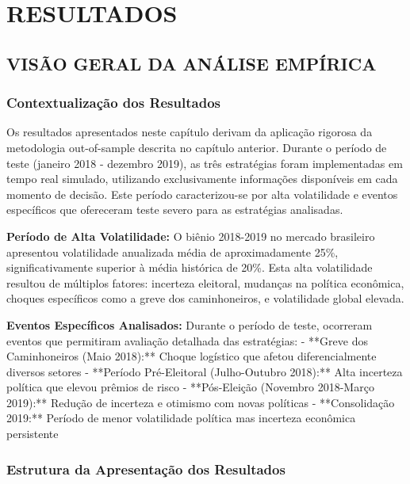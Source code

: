 
\chapter{RESULTADOS}

\section{VISÃO GERAL DA ANÁLISE EMPÍRICA}

\subsection{Contextualização dos Resultados}

Os resultados apresentados neste capítulo derivam da aplicação rigorosa da metodologia out-of-sample descrita no capítulo anterior. Durante o período de teste (janeiro 2018 - dezembro 2019), as três estratégias foram implementadas em tempo real simulado, utilizando exclusivamente informações disponíveis em cada momento de decisão. Este período caracterizou-se por alta volatilidade e eventos específicos que ofereceram teste severo para as estratégias analisadas.

\textbf{Período de Alta Volatilidade:} O biênio 2018-2019 no mercado brasileiro apresentou volatilidade anualizada média de aproximadamente 25\%, significativamente superior à média histórica de 20\%. Esta alta volatilidade resultou de múltiplos fatores: incerteza eleitoral, mudanças na política econômica, choques específicos como a greve dos caminhoneiros, e volatilidade global elevada.

\textbf{Eventos Específicos Analisados:} Durante o período de teste, ocorreram eventos que permitiram avaliação detalhada das estratégias:
- **Greve dos Caminhoneiros (Maio 2018):** Choque logístico que afetou diferencialmente diversos setores
- **Período Pré-Eleitoral (Julho-Outubro 2018):** Alta incerteza política que elevou prêmios de risco
- **Pós-Eleição (Novembro 2018-Março 2019):** Redução de incerteza e otimismo com novas políticas
- **Consolidação 2019:** Período de menor volatilidade política mas incerteza econômica persistente

\subsection{Estrutura da Apresentação dos Resultados}

